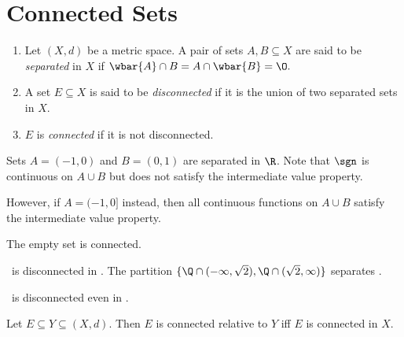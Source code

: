 \section{Connected Sets} \label{sec:connected}

\begin{definition*} \label{def:connected} \leavevmode
    \begin{enumerate}[label=(\alph*)]
        \item Let $(X, d)$ be a metric space.
        A pair of sets $A, B \subseteq X$ are said to be \emph{separated} in
        $X$ if $\wbar{A} \cap B = A \cap \wbar{B} = \O.$
        \item A set $E \subseteq X$ is said to be \emph{disconnected} if it
        is the union of two separated sets in $X$.
        \item $E$ is \emph{connected} if it is not disconnected.
    \end{enumerate}
\end{definition*}
\begin{examples}
    \item Sets $A = (-1, 0)$ and $B = (0, 1)$ are separated in $\R$.
    Note that $\sgn$ is continuous on $A \cup B$ but does not satisfy the
    intermediate value property.

    However, if $A = (-1, 0]$ instead, then all continuous functions on
    $A \cup B$ satisfy the intermediate value property.
    \item The empty set is connected.
    \item \Q\ is disconnected in \R.
    The partition
    $\{\Q \cap (-\infty, \sqrt 2), \Q \cap (\sqrt 2, \infty)\}$
    separates \Q.
    \item \Q\ is disconnected even in \Q.
\end{examples}
\begin{exercise}
    Let $E \subseteq Y \subseteq (X, d)$.
    Then $E$ is connected relative to $Y$ iff $E$ is connected in $X$.
\end{exercise}

